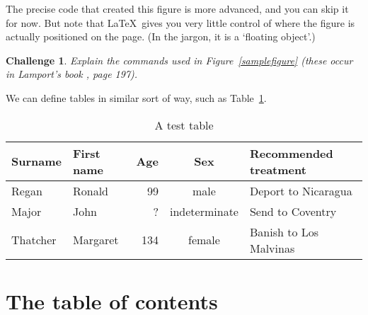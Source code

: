 \documentclass[a4paper]{article}
\newtheorem{chall}[thm]{Challenge}
\begin{document}
The precise code that created this figure is more advanced, and you can skip it for
now.  But note that \LaTeX\ gives you very little control of where the figure 
is actually positioned on the page.  (In the jargon, it is a `floating object'.)

\begin{chall}\label{pictureproblem} 
Explain the commands used in Figure~\ref{samplefigure}
(these occur in Lamport's book \cite{latexbook}, page 197).
\end{chall}

We can define tables in similar sort of way, such as Table~\ref{sampletable}.

\begin{table}
\caption{A test table}\label{sampletable}
\begin{center}
\begin{tabular}{ll|r|c|l}
Surname & First name & Age & Sex & Recommended treatment \\
\hline\hline
Regan & Ronald & 99 & male & Deport to Nicaragua \\
\hline
Major & John   & ? & indeterminate & Send to Coventry \\
\hline
Thatcher & Margaret & 134 & female & Banish to Los Malvinas \\
\hline\hline
\end{tabular}
\end{center}
\end{table}

\section{The table of contents}
\end{document}
